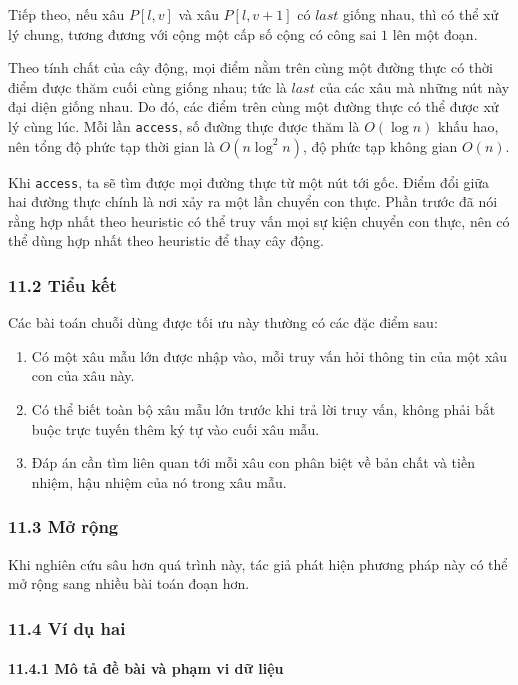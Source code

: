 \documentclass[11pt]{article}
\begin{document}
Tiếp theo, nếu xâu \(P[l,v]\) và xâu \(P[l,v+1]\) có \(last\) giống nhau, thì có
thể xử lý chung, tương đương với cộng một cấp số cộng có công sai \(1\) lên một
đoạn.

Theo tính chất của cây động, mọi điểm nằm trên cùng một đường thực có thời điểm
được thăm cuối cùng giống nhau; tức là \(last\) của các xâu mà những nút này đại
diện giống nhau. Do đó, các điểm trên cùng một đường thực có thể được xử lý
cùng lúc. Mỗi lần \texttt{access}, số đường thực được thăm là \(O(\log n)\) khấu
hao, nên tổng độ phức tạp thời gian là \(O(n\log^2 n)\), độ phức tạp không gian
\(O(n)\).

Khi \texttt{access}, ta sẽ tìm được mọi đường thực từ một nút tới gốc. Điểm đổi
giữa hai đường thực chính là nơi xảy ra một lần chuyển con thực. Phần trước đã
nói rằng hợp nhất theo heuristic có thể truy vấn mọi sự kiện chuyển con thực,
nên có thể dùng hợp nhất theo heuristic để thay cây động.

\subsubsection*{11.2 Tiểu kết}

Các bài toán chuỗi dùng được tối ưu này thường có các đặc điểm sau:
\begin{enumerate}
  \item Có một xâu mẫu lớn được nhập vào, mỗi truy vấn hỏi thông tin của một xâu
  con của xâu này.
  \item Có thể biết toàn bộ xâu mẫu lớn trước khi trả lời truy vấn, không phải
  bắt buộc trực tuyến thêm ký tự vào cuối xâu mẫu.
  \item Đáp án cần tìm liên quan tới mỗi xâu con phân biệt về bản chất và tiền
  nhiệm, hậu nhiệm của nó trong xâu mẫu.
\end{enumerate}

\subsubsection*{11.3 Mở rộng}

Khi nghiên cứu sâu hơn quá trình này, tác giả phát hiện phương pháp này có thể
mở rộng sang nhiều bài toán đoạn hơn.

\subsubsection*{11.4 Ví dụ hai}

\paragraph{11.4.1 Mô tả đề bài và phạm vi dữ liệu}
\end{document}
